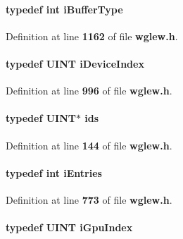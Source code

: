 \paragraph[{i\+Buffer\+Type}]{\setlength{\rightskip}{0pt plus 5cm}typedef {\bf int} {\bf i\+Buffer\+Type}}\label{wglew_8h_ae03f4985c7e8773d829d7757c43a7876}


Definition at line {\bf 1162} of file {\bf wglew.\+h}.

\paragraph[{i\+Device\+Index}]{\setlength{\rightskip}{0pt plus 5cm}typedef {\bf U\+I\+NT} {\bf i\+Device\+Index}}\label{wglew_8h_a0cd9bdd9a7451e220a7eed9905059216}


Definition at line {\bf 996} of file {\bf wglew.\+h}.

\paragraph[{ids}]{\setlength{\rightskip}{0pt plus 5cm}typedef {\bf U\+I\+NT}$\ast$ {\bf ids}}\label{wglew_8h_a4ae7c8888a9ef9a8a8434df7521ab625}


Definition at line {\bf 144} of file {\bf wglew.\+h}.

\paragraph[{i\+Entries}]{\setlength{\rightskip}{0pt plus 5cm}typedef {\bf int} {\bf i\+Entries}}\label{wglew_8h_a80258a3c992d0cb8c4e4c7bf0b18db1e}


Definition at line {\bf 773} of file {\bf wglew.\+h}.

\paragraph[{i\+Gpu\+Index}]{\setlength{\rightskip}{0pt plus 5cm}typedef {\bf U\+I\+NT} {\bf i\+Gpu\+Index}}\label{wglew_8h_acffc60a856cb6f3c567e4262cdc27321}


